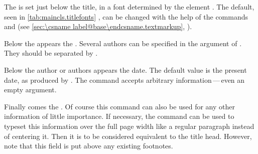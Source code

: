 The
 is set just below the title, in a font determined by the
element %
. The default, seen in
\autoref{tab:maincls.titlefonts}%
, %
can be changed with the help of the commands  and
 (see \autoref{sec:\csname
  label@base\endcsname.textmarkup}, ).


Below the  appears the
.  Several authors can be
specified in the argument of . They should be separated
by .

Below the author or authors appears the
date. The default value is the present date, as produced by
. The  command accepts arbitrary
information\,---\,even an empty argument.

Finally comes the
. Of course this command can also
be used for any other information of little importance. If necessary, the
 command can be used to typeset this information over the full
page width like a regular paragraph instead of centering it.  Then it is to be
considered equivalent to the title head. However, note that this field is put
above any existing footnotes.

